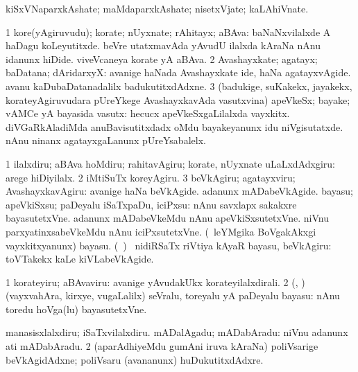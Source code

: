 \bentry
{} 
\gl{\nA}
\expl{}
\bmng
kiSxVNaparxkAshate; maMdaparxkAshate; nisetxVjate; kaLAhiVnate. 
\emng
\eentry

\bentry
{} 
\gl{\nA}
\expl{}
\bmng
\bnum
\num{1} kore(yAgiruvudu); korate; nUyxnate; rAhitayx; aBAva:  baNaNxvilalxde A haDagu koLeyutitxde.  beVre utatxmavAda yAvudU ilalxda kAraNa nAnu idanunx hiDide.  viveVcaneya korate yA aBAva. 
\num{2} Avashayxkate; agatayx; baDatana; dAridarxyX:  avanige haNada Avashayxkate ide, haNa agatayxvAgide.  avanu kaDubaDatanadalilx badukutitxdAdxne. 
\num{3} (badukige, suKakekx, jayakekx, korateyAgiruvudara pUreYkege AvashayxkavAda vasutxvina) apeVkeSx; bayake; vAMCe yA bayasida vasutx:  hecucx apeVkeSxgaLilalxda vayxkitx.  diVGaRkAladiMda anuBavisutitxdadx oMdu bayakeyanunx idu niVgisutatxde.  nAnu ninanx agatayxgaLanunx pUreYsabalelx. 
\enum
\emng
\eentry

\bentry
{} 
\gl{\sakirx}
\expl{}
\bmng
\bnum
\num{1} ilalxdiru; aBAva hoMdiru; rahitavAgiru; korate, nUyxnate uLaLxdAdxgiru:  arege hiDiyilalx. 
\num{2} iMtiSuTx koreyAgiru. 
\num{3} beVkAgiru; agatayxviru; AvashayxkavAgiru:  avanige haNa beVkAgide.  adanunx mADabeVkAgide. 
\banum
{} bayasu; apeVkiSxsu; paDeyalu iSaTxpaDu, iciPxsu:  nAnu savxlapx sakakxre bayasutetxVne.  adanunx mADabeVkeMdu nAnu apeVkiSxsutetxVne.  niVnu parxyatinxsabeVkeMdu nAnu iciPxsutetxVne. 
 (\kanmu\ leYMgika BoVgakAkxgi vayxkitxyanunx) bayasu. 
 (\kanmu\ \birx) \kanmu\ nidiRSaTx riVtiya kAyaR bayasu, beVkAgiru:  toVTakekx kaLe kiVLabeVkAgide. 
\eanum
\numie
\enum
\emng

  \noindent 
\gl{\akirx}
\expl{}
\bmng
\bnum
\num{1} korateyiru; aBAvaviru:  avanige yAvudakUkx korateyilalxdirali. 
\num{2} (\ame, \AmA) (vayxvahAra, kirxye, \mo vugaLalilx) seVralu, toreyalu yA paDeyalu bayasu:  nAnu toredu hoVga(lu) bayasutetxVne. 
\enum
\emng

\noindent 
\gl{\pagu}
\expl{}
\bmng
\bnum
{}  
\banum
{} manasisxlalxdiru; iSaTxvilalxdiru. 
 mADalAgadu; mADabAradu:  niVnu adanunx ati mADabAradu. 
\eanum
\numie
\num{2}  (aparAdhiyeMdu gumAni iruva kAraNa) poliVsarige beVkAgidAdxne; poliVsaru (avananunx) huDukutitxdAdxre. 
\enum
\emng
\eentry

